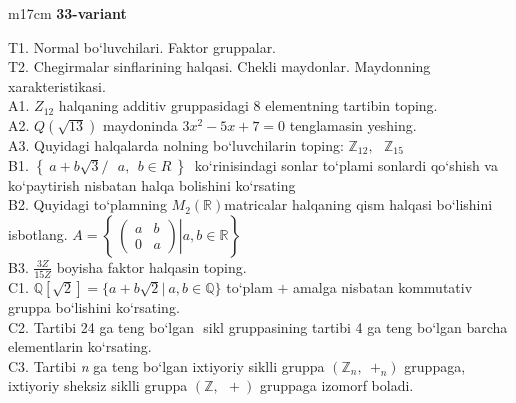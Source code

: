 \documentclass{article}
\begin{document}
\vspace{1cm}


\begin{tabular}{m{17cm}}
\textbf{33-variant}
\newline

T1. Normal bo`luvchilari. Faktor gruppalar. \\
T2. Chegirmalar sinflarining halqasi. Chekli maydonlar. Maydonning xarakteristikasi. \\
A1. \(Z_{12}\) halqaning additiv gruppasidagi 8 elementning tartibin toping. \\
A2. \(Q(\sqrt{13})\) maydoninda \(3x^{2} - 5x + 7 = 0\) tenglamasin yeshing. \\
A3. Quyidagi halqalarda nolning bo`luvchilarin toping: \(\mathbb{Z}_{12},\ \ \ \mathbb{Z}_{15}\) \\
B1. \(\left\{ \left. \ a + b\sqrt{3}/\ \ \ a,\ \ b \in R\  \right\} \right.\ \) ko`rinisindagi sonlar to`plami sonlardi qo`shish va ko`paytirish nisbatan halqa bolishini ko`rsating \\
B2. Quyidagi to`plamning \(M_{2}(\mathbb{R})\)matricalar halqaning qism halqasi bo`lishini isbotlang. \(A = \left\{ \left. \ \begin{pmatrix}
a & b \\
0 & a
\end{pmatrix} \right|a,b\mathbb{\in R} \right\}\) \\
B3. \(\frac{3Z}{15Z}\) boyisha faktor halqasin toping. \\
C1. \(\mathbb{Q}\left\lbrack \sqrt{2} \right\rbrack = \{ a + b\sqrt{2}|\ a,b\mathbb{\in Q}\}\) to`plam \(+\) amalga nisbatan kommutativ gruppa bo`lishini ko`rsating. \\
C2. Tartibi 24 ga teng bo`lgan \(< a >\) sikl gruppasining tartibi 4 ga teng bo`lgan barcha elementlarin ko`rsating. \\
C3. Tartibi \emph{n} ga teng bo`lgan ixtiyoriy siklli gruppa \((\mathbb{Z}_{n},\ \  +_{n})\) gruppaga, ixtiyoriy sheksiz siklli gruppa \((\mathbb{Z},\ \  + )\) gruppaga izomorf boladi. \\

\end{tabular}
\vspace{1cm}
\end{document}
